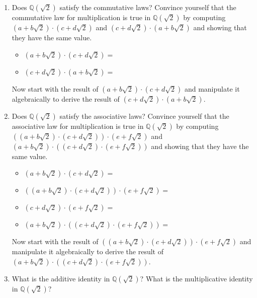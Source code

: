 \documentclass[11pt]{article}
\theoremstyle{definition}
\begin{document}
  \begin{enumerate}
    \item Does $\mathbb{Q}(\sqrt{2})$ satisfy the commutative laws? Convince yourself that the commutative law for multiplication is true in $\mathbb{Q}(\sqrt{2})$
      by computing $(a+b\sqrt{2})\cdot (c+d\sqrt{2})$ and $(c+d\sqrt{2})\cdot (a+b\sqrt{2})$ and showing that they have the same value.
      \begin{itemize}
        \item $(a+b\sqrt{2})\cdot (c+d\sqrt{2}) = $
        \item $(c+d\sqrt{2})\cdot (a+b\sqrt{2}) = $
      \end{itemize}
      Now start with the result of $(a+b\sqrt{2})\cdot (c+d\sqrt{2})$ and manipulate it algebraically to derive the result of $(c+d\sqrt{2})\cdot (a+b\sqrt{2})$.

      \vspace{1in}

    \item Does $\mathbb{Q}(\sqrt{2})$ satisfy the associative laws? Convince yourself that the associative law for multiplication is true in $\mathbb{Q}(\sqrt{2})$
      by computing $((a+b\sqrt{2})\cdot (c+d\sqrt{2}))\cdot (e + f\sqrt{2})$ and $(a+b\sqrt{2})\cdot ( (c+d\sqrt{2})\cdot (e+f\sqrt{2}) )$ and showing that 
      they have the same value.
      \begin{itemize}
        \item $(a+b\sqrt{2})\cdot (c+d\sqrt{2}) =$
        \item $((a+b\sqrt{2})\cdot (c+d\sqrt{2}))\cdot (e + f\sqrt{2}) = $
      \end{itemize}
      \vspace{1in}
      \begin{itemize}
        \item $(c+d\sqrt{2})\cdot (e+f\sqrt{2}) = $
        \item $(a+b\sqrt{2})\cdot ( (c+d\sqrt{2})\cdot (e+f\sqrt{2}) ) =$
      \end{itemize}
      \vspace{1in}
      Now start with the result of $((a+b\sqrt{2})\cdot (c+d\sqrt{2}))\cdot (e + f\sqrt{2})$ and manipulate it algebraically to derive the result of 
      $(a+b\sqrt{2})\cdot ( (c+d\sqrt{2})\cdot (e+f\sqrt{2}) )$.

      \vspace{1.25in}


    \item What is the additive identity in $\mathbb{Q}(\sqrt{2})$? What is the multiplicative identity in $\mathbb{Q}(\sqrt{2})$?


\end{enumerate}
\end{document}
